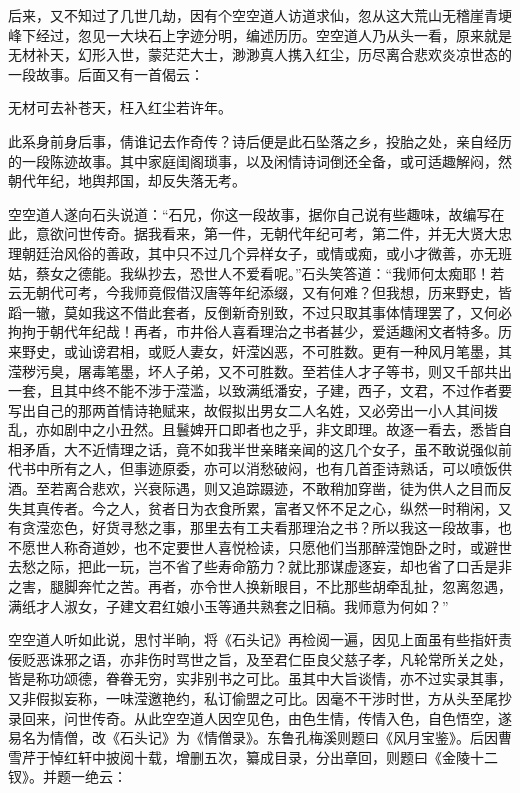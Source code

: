 后来，又不知过了几世几劫，因有个空空道人访道求仙，忽从这大荒山无稽崖青埂峰下经过，忽见一大块石上字迹分明，编述历历。空空道人乃从头一看，原来就是无材补天，幻形入世，蒙茫茫大士，渺渺真人携入红尘，历尽离合悲欢炎凉世态的一段故事。后面又有一首偈云：

无材可去补苍天，枉入红尘若许年。

此系身前身后事，倩谁记去作奇传？诗后便是此石坠落之乡，投胎之处，亲自经历的一段陈迹故事。其中家庭闺阁琐事，以及闲情诗词倒还全备，或可适趣解闷，然朝代年纪，地舆邦国，却反失落无考。

空空道人遂向石头说道：“石兄，你这一段故事，据你自己说有些趣味，故编写在此，意欲问世传奇。据我看来，第一件，无朝代年纪可考，第二件，并无大贤大忠理朝廷治风俗的善政，其中只不过几个异样女子，或情或痴，或小才微善，亦无班姑，蔡女之德能。我纵抄去，恐世人不爱看呢。”石头笑答道：“我师何太痴耶！若云无朝代可考，今我师竟假借汉唐等年纪添缀，又有何难？但我想，历来野史，皆蹈一辙，莫如我这不借此套者，反倒新奇别致，不过只取其事体情理罢了，又何必拘拘于朝代年纪哉！再者，市井俗人喜看理治之书者甚少，爱适趣闲文者特多。历来野史，或讪谤君相，或贬人妻女，奸滢凶恶，不可胜数。更有一种风月笔墨，其滢秽污臭，屠毒笔墨，坏人子弟，又不可胜数。至若佳人才子等书，则又千部共出一套，且其中终不能不涉于滢滥，以致满纸潘安，子建，西子，文君，不过作者要写出自己的那两首情诗艳赋来，故假拟出男女二人名姓，又必旁出一小人其间拨乱，亦如剧中之小丑然。且鬟婢开口即者也之乎，非文即理。故逐一看去，悉皆自相矛盾，大不近情理之话，竟不如我半世亲睹亲闻的这几个女子，虽不敢说强似前代书中所有之人，但事迹原委，亦可以消愁破闷，也有几首歪诗熟话，可以喷饭供酒。至若离合悲欢，兴衰际遇，则又追踪蹑迹，不敢稍加穿凿，徒为供人之目而反失其真传者。今之人，贫者日为衣食所累，富者又怀不足之心，纵然一时稍闲，又有贪滢恋色，好货寻愁之事，那里去有工夫看那理治之书？所以我这一段故事，也不愿世人称奇道妙，也不定要世人喜悦检读，只愿他们当那醉滢饱卧之时，或避世去愁之际，把此一玩，岂不省了些寿命筋力？就比那谋虚逐妄，却也省了口舌是非之害，腿脚奔忙之苦。再者，亦令世人换新眼目，不比那些胡牵乱扯，忽离忽遇，满纸才人淑女，子建文君红娘小玉等通共熟套之旧稿。我师意为何如？”

空空道人听如此说，思忖半晌，将《石头记》再检阅一遍，因见上面虽有些指奸责佞贬恶诛邪之语，亦非伤时骂世之旨，及至君仁臣良父慈子孝，凡轮常所关之处，皆是称功颂德，眷眷无穷，实非别书之可比。虽其中大旨谈情，亦不过实录其事，又非假拟妄称，一味滢邀艳约，私订偷盟之可比。因毫不干涉时世，方从头至尾抄录回来，问世传奇。从此空空道人因空见色，由色生情，传情入色，自色悟空，遂易名为情僧，改《石头记》为《情僧录》。东鲁孔梅溪则题曰《风月宝鉴》。后因曹雪芹于悼红轩中披阅十载，增删五次，纂成目录，分出章回，则题曰《金陵十二钗》。并题一绝云：

